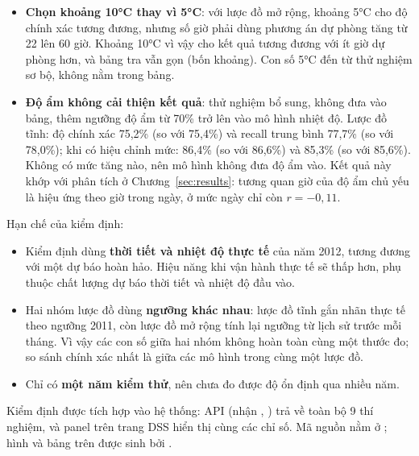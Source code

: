 \begin{itemize}
    \item \textbf{Chọn khoảng 10°C thay vì 5°C}: với lược đồ mở rộng, khoảng 5°C cho độ chính xác tương đương, nhưng số giờ phải dùng phương án dự phòng tăng từ 22 lên 60 giờ. Khoảng 10°C vì vậy cho kết quả tương đương với ít giờ dự phòng hơn, và bảng tra vẫn gọn (bốn khoảng). Con số 5°C đến từ thử nghiệm sơ bộ, không nằm trong bảng.
    \item \textbf{Độ ẩm không cải thiện kết quả}: thử nghiệm bổ sung, không đưa vào bảng, thêm ngưỡng độ ẩm từ 70\% trở lên vào mô hình nhiệt độ. Lược đồ tĩnh: độ chính xác 75,2\% (so với 75,4\%) và recall trung bình 77,7\% (so với 78,0\%); khi có hiệu chỉnh mức: 86,4\% (so với 86,6\%) và 85,3\% (so với 85,6\%). Không có mức tăng nào, nên mô hình không đưa độ ẩm vào. Kết quả này khớp với phân tích ở Chương~\ref{sec:results}: tương quan giờ của độ ẩm chủ yếu là hiệu ứng theo giờ trong ngày, ở mức ngày chỉ còn $r = -0{,}11$.
\end{itemize}

\noindent Hạn chế của kiểm định:
\begin{itemize}
    \item Kiểm định dùng \textbf{thời tiết và nhiệt độ thực tế} của năm 2012, tương đương với một dự báo hoàn hảo. Hiệu năng khi vận hành thực tế sẽ thấp hơn, phụ thuộc chất lượng dự báo thời tiết và nhiệt độ đầu vào.
    \item Hai nhóm lược đồ dùng \textbf{ngưỡng khác nhau}: lược đồ tĩnh gắn nhãn thực tế theo ngưỡng 2011, còn lược đồ mở rộng tính lại ngưỡng từ lịch sử trước mỗi tháng. Vì vậy các con số giữa hai nhóm không hoàn toàn cùng một thước đo; so sánh chính xác nhất là giữa các mô hình trong cùng một lược đồ.
    \item Chỉ có \textbf{một năm kiểm thử}, nên chưa đo được độ ổn định qua nhiều năm.
\end{itemize}

Kiểm định được tích hợp vào hệ thống: API  (nhận , ) trả về toàn bộ 9 thí nghiệm, và panel  trên trang DSS hiển thị cùng các chỉ số. Mã nguồn nằm ở ; hình và bảng trên được sinh bởi .

